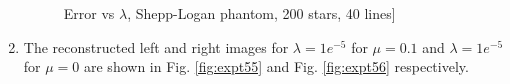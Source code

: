 \begin{enumerate}
\begin{figure}[H]

\hspace{-0.1in}
\caption [Error vs $\lambda$, Shepp-Logan phantom, 200 stars,  40 lines]{Error vs $\lambda$, Shepp-Logan phantom, 200 stars,  40 lines]}
\label{fig:expt54}
\end{figure}

\item The reconstructed left and right images for $\lambda = 1e^{-5}$ for  $\mu  = 0.1 $  and $\lambda = 1e^{-5}$ for  $\mu = 0$ are shown in Fig. \ref{fig:expt55} and  Fig. \ref{fig:expt56} respectively. 


\end{enumerate}

